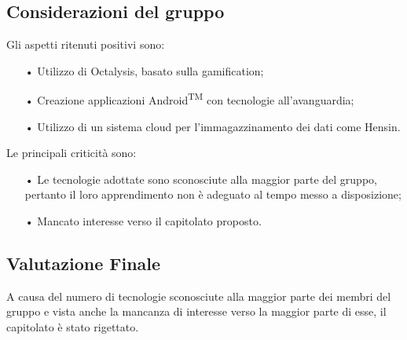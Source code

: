 \subsection{Considerazioni del gruppo}
Gli aspetti ritenuti positivi sono: 
\begin{itemize}
\item[•] Utilizzo di Octalysis, basato sulla {gamification};
\item[•] Creazione applicazioni Android\textsuperscript{TM} con tecnologie all'avanguardia;
\item[•] Utilizzo di un sistema cloud per l'immagazzinamento dei dati come Hensin.
\end{itemize}

Le principali criticità sono:
\begin{itemize}
\item[•] Le tecnologie adottate sono sconosciute alla maggior parte del gruppo, pertanto il loro apprendimento non è adeguato al tempo messo a disposizione;
\item[•] Mancato interesse verso il capitolato proposto.
\end{itemize}

\subsection{Valutazione Finale}
A causa del numero di tecnologie sconosciute alla maggior parte dei membri del gruppo e vista anche la mancanza di interesse verso la maggior parte di esse, il capitolato è stato rigettato.

